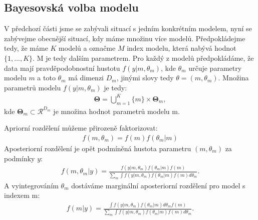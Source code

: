 \documentclass[czech,master,public,dept470,male,cpdeclaration,oneside, python]{diploma}
\begin{document}
\subsection{Bayesovská volba modelu}
V předchozí části jsme se zabývali situací s jedním konkrétním modelem, nyní se zabývejme obecnější situací, kdy máme množinu více modelů. Předpokládejme tedy, že máme $K$ modelů a označme $M$ index modelu, která nabývá hodnot $\{1, ..., K\}$. M je tedy dalším parametrem. Pro každý z modelů předpokládáme, že data mají pravděpodobnostní hustotu $f(y |m,  \theta_m)$, kde $\theta_m$ určuje parametry modelu $m$ a toto $\theta_m$ má dimenzi $D_m$, jinými slovy tedy $\theta = (m, \theta_m)$. Množina parametrů modelu $f(y |m,  \theta_m)$ je tedy:
\begin{align}
\boldsymbol{\Theta} = \bigcup_{m=1}^{K} \{m\} \times \boldsymbol{\Theta}_m,
\end{align}
 kde $\boldsymbol{\Theta}_m \subset \mathcal{R}^{D_m}$ je množina hodnot parametrů modelu m. \par
Apriorní rozdělení můžeme přirozeně faktorizovat:
\begin{align}
f(m, \theta_m) = f(m)f(\theta_m | m)
\end{align}
Aposteriorní rozdělení je opět podmíněná hustota parametru $(m, \theta_m)$ za podmínky $y$:
\begin{align}
f(m, \theta_m | y) = 
\frac{f(y | m, \theta_m)f(\theta_m | m)f(m)}{\sum_m \int f(y | m, \theta_m)f(\theta_m | m)f(m) d\theta_m}.
\end{align}
A vyintegrováním $\theta_m$ dostáváme marginální aposteriorní rozdělení pro model s indexem m:
\begin{align}
f(m | y) =  \frac{\int f(y | m, \theta_m)f(\theta_m | m) d\theta_m f(m)}{\sum_m \int f(y | m, \theta_m)f(\theta_m | m)f(m) d\theta_m}.
\end{align}  
\end{document}
